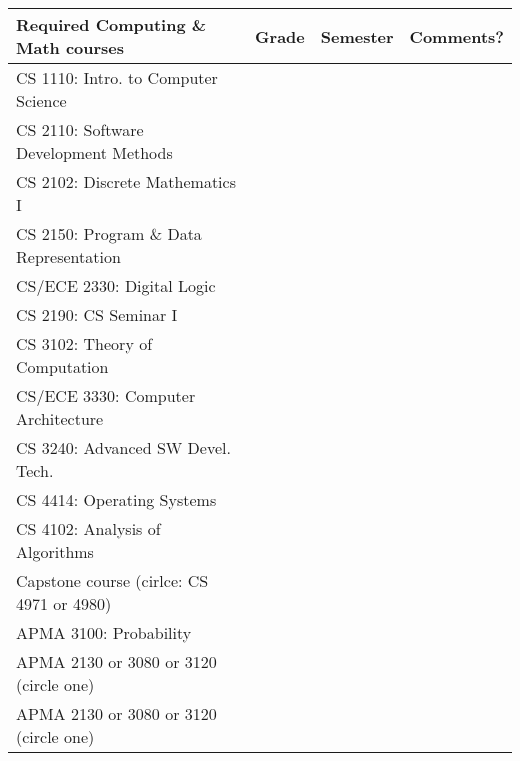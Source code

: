 \documentclass[10pt,letter]{book}
\begin{document}
\small 
\begin{tabular}{|l|l|l|l|} \hline
\bf Required Computing \& Math courses & \bf Grade & \bf Semester &
\bf Comments? \\ \hline \hline
CS 1110: Intro. to Computer Science & & & \\ \hline
CS 2110: Software Development Methods & & & \\ \hline
CS 2102: Discrete Mathematics I & & & \\ \hline
CS 2150: Program \& Data Representation & & & \\ \hline
CS/ECE 2330: Digital Logic & & & \\ \hline
CS 2190: CS Seminar I & & & \\ \hline
CS 3102: Theory of Computation & & & \\ \hline
CS/ECE 3330: Computer Architecture & & & \\ \hline
CS 3240: Advanced SW Devel. Tech. & & & \\ \hline
CS 4414: Operating Systems & & & \\ \hline
CS 4102: Analysis of Algorithms & & & \\ \hline
Capstone course (cirlce: CS 4971 or 4980) & & & \\ \hline
APMA 3100: Probability & & & \\ \hline
APMA 2130 or 3080 or 3120 (circle one) & & & \\ \hline
APMA 2130 or 3080 or 3120 (circle one) & & & \\ \hline
\end{tabular}
\end{document}

